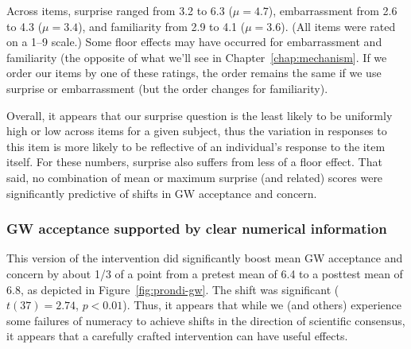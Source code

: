 Across items, surprise ranged from 3.2 to 6.3 ($\mu=4.7$), embarrassment from
2.6 to 4.3 ($\mu=3.4$), and familiarity from 2.9 to 4.1 ($\mu=3.6$). (All items
were rated on a 1--9 scale.) Some floor effects may have occurred for embarrassment
and familiarity (the opposite of what we'll see in Chapter~\ref{chap:mechanism}.
If we order our items by one of these ratings, the order remains the same if we
use surprise or embarrassment (but the order changes for familiarity). 

Overall, it appears that our surprise question is the least likely to be
uniformly high or low across items for a given subject, thus the variation in
responses to this item is more likely to be reflective of an individual's
response to the item itself. For these numbers, surprise also suffers from less of a
floor effect. That said, no combination of mean or maximum surprise (and
related) scores were significantly predictive of shifts in GW acceptance and
concern.

\subsubsection{GW acceptance supported by clear numerical information}

This version of the intervention did significantly boost mean GW acceptance and
concern by about 1/3 of a point from a pretest mean of 6.4 to a posttest mean of
6.8, as depicted in Figure~\ref{fig:prondi-gw}. The shift was significant
($t(37) = 2.74$, $p < 0.01$). Thus, it appears that while we (and others)
experience some failures of numeracy to achieve shifts in the direction of
scientific consensus, it appears that a carefully crafted intervention can have
useful effects.

